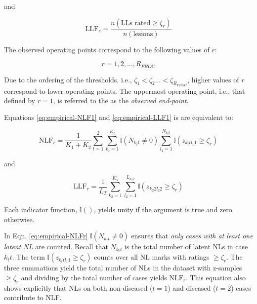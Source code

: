 \documentclass[
]{book}
\begin{document}
and

\begin{equation}
\text{LLF}_r  = \frac{n\left ( \text{LLs rated} \geq \zeta_r\right )}{n\left ( \text{lesions} \right )}
\label{eq:empirical-LLF1}
\end{equation}

The observed operating points correspond to the following values of \(r\):

\begin{equation}
r = 1, 2, ...,R_{FROC} 
\label{eq:empirical-range-r}
\end{equation}

Due to the ordering of the thresholds, i.e., \(\zeta_1 < \zeta_2 ... < \zeta_{R_{FROC}}\), higher values of \(r\) correspond to lower operating points. The uppermost operating point, i.e., that defined by \(r = 1\), is referred to the as the \emph{observed end-point}.

Equations \eqref{eq:empirical-NLF1} and \eqref{eq:empirical-LLF1} is are equivalent to:

\begin{equation}
\text{NLF}_r  = \frac{1}{K_1+K_2} \sum_{t=1}^{2} \sum_{k_t=1}^{K_t} \mathbb{I} \left ( N_{k_t t} \neq 0 \right )\sum_{l_1=1}^{N_{k_t t}} \mathbb{I} \left ( z_{k_t t l_1 1} \geq \zeta_r \right ) 
\label{eq:empirical-NLFr}
\end{equation}

and

\begin{equation}
\text{LLF}_r  = \frac{1}{L_T} \sum_{k_2=1}^{K_2} \sum_{l_2=1}^{L_{k_2 2}} \mathbb{I} \left ( z_{k_2 2 l_2 2} \geq \zeta_r  \right ) 
\label{eq:empirical-LLFr}
\end{equation}

Each indicator function, \(\mathbb{I}()\), yields unity if the argument is true and zero otherwise.

In Eqn. \eqref{eq:empirical-NLFr} \(\mathbb{I} \left ( N_{k_t t} \neq 0 \right )\) ensures that \emph{only cases with at least one latent NL} are counted. Recall that \(N_{k_t t}\) is the total number of latent NLs in case \(k_t t\). The term \(\mathbb{I} \left ( z_{k_t t l_1 1} \geq \zeta_r \right )\) counts over all NL marks with ratings \(\geq \zeta_r\). The three summations yield the total number of NLs in the dataset with z-samples \(\geq \zeta_r\) and dividing by the total number of cases yields \(\text{NLF}_r\). This equation also shows explicitly that NLs on both non-diseased (\(t=1\)) and diseased (\(t=2\)) cases contribute to NLF.
\end{document}
